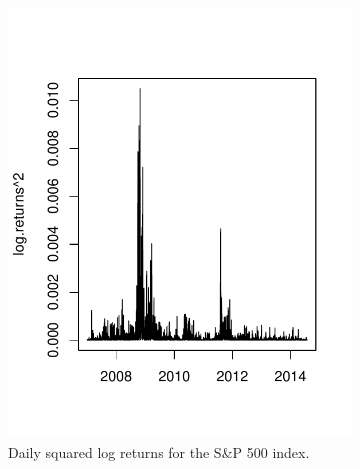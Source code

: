 %
%
\begin{figure}[htbp]
        \centering
        \begin{subfigure}[t]{0.4\textwidth}
                \includegraphics[width=\textwidth]{./chapter-1-introduction/SP500-daily-squared-log-returns.pdf}
                \caption{Daily squared log returns for the S\&P 500 index.}
                \label{fig:sp500-returns}
        \end{subfigure}%
        \quad %
        \begin{subfigure}[t]{0.4\textwidth}

\end{subfigure}
\end{figure}
